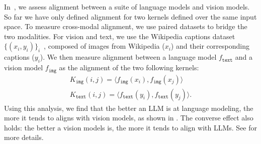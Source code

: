 \documentclass{article}
\theoremstyle{plain}
\theoremstyle{definition}
\theoremstyle{remark}
\begin{document}
In~, we assess alignment between a suite of language models and vision models. So far we have only defined alignment for two kernels defined over the same input space. To measure cross-modal alignment, we use paired datasets to bridge the two modalities. For vision and text, we use the Wikipedia captions dataset $\{(x_i, y_i)\}_i$~\cite{srinivasan2021wit}, composed of images from Wikipedia ($x_i$) and their corresponding captions ($y_i$). We then measure alignment between a language model $f_{\texttt{text}}$ and a vision model $f_{\texttt{img}}$ as the alignment of the two following kernels:
\begin{align}
    K_\texttt{img}(i, j) = \langle f_{\texttt{img}}(x_i), f_{\texttt{img}}(x_j) \rangle\\
    K_\texttt{text}(i, j) = \langle f_{\texttt{text}}(y_i), f_{\texttt{text}}(y_j) \rangle.
\end{align}
Using this analysis, we find that the better an LLM is at language modeling, the more it tends to aligns with vision models, as shown in . The converse effect also holds: the better a vision models is, the more it tends to align with LLMs. See  for more details.
\end{document}
